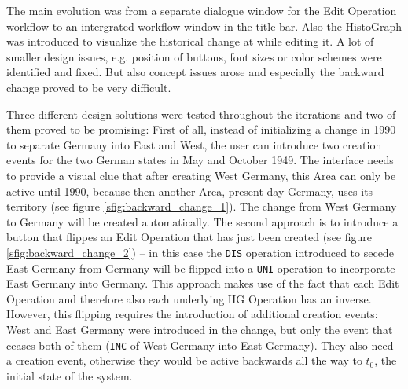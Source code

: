 The main evolution was from a separate dialogue window for the Edit Operation workflow to an intergrated workflow window in the title bar. Also the HistoGraph was introduced to visualize the historical change at while editing it. A lot of smaller design issues, e.g. position of buttons, font sizes or color schemes were identified and fixed. But also concept issues arose and especially the backward change proved to be very difficult.

Three different design solutions were tested throughout the iterations and two of them proved to be promising: First of all, instead of initializing a change in 1990 to separate Germany into East and West, the user can introduce two creation events for the two German states in May and October 1949. The interface needs to provide a visual clue that after creating West Germany, this Area can only be active until 1990, because then another Area, present-day Germany, uses its territory (see figure \ref{sfig:backward_change_1}). The change from West Germany to Germany will be created automatically. The second approach is to introduce a button that flippes an Edit Operation that has just been created (see figure \ref{sfig:backward_change_2}) -- in this case the \texttt{DIS} operation introduced to secede East Germany from Germany will be flipped into a \texttt{UNI} operation to incorporate East Germany into Germany. This approach makes use of the fact that each Edit Operation and therefore also each underlying HG Operation has an inverse.
However, this flipping requires the introduction of additional creation events: West and East Germany were introduced in the change, but only the event that ceases both of them (\texttt{INC} of West Germany into East Germany). They also need a creation event, otherwise they would be active backwards all the way to $t_0$, the initial state of the system.


